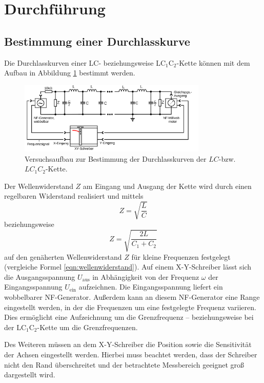 \section{Durchführung}
\label{sec:Durchführung}

\subsection{Bestimmung einer Durchlasskurve}
Die Durchlasskurven einer LC- beziehungsweise LC$_1$C$_2$-Kette können
mit dem Aufbau in Abbildung \ref{fig:durchlasskurve} bestimmt werden.
\begin{figure}
    \centering
    \includegraphics[width=0.8\textwidth]{Bilder/durchlasskurve.png}
    \caption{Versuchsaufbau zur Bestimmung der Durchlasskurven der $LC$-bzw. $LC_1C_2$-Kette. \cite{Anleitung}}
    \label{fig:durchlasskurve}
\end{figure}
Der Wellenwiderstand $Z$ am Eingang und Ausgang der Kette wird durch einen
regelbaren Widerstand realisiert und mittels
\begin{equation}
	Z = \sqrt{\frac{L}{C}}
\end{equation}
beziehungsweise
\begin{equation}
	Z = \sqrt{\frac{2L}{C_1+C_2}}
\end{equation}
auf den genäherten Wellenwiderstand $Z$ für kleine Frequenzen festgelegt (vergleiche Formel \eqref{eqn:wellenwiderstand}).
Auf einem X-Y-Schreiber lässt sich die Ausgangsspannung $U_{\text{aus}}$ in Abhängigkeit von der Frequenz $\omega$ der Eingangsspannung $U_{\text{ein}}$ aufzeichnen.
Die Eingangsspannung liefert ein wobbelbarer NF-Generator.
Außerdem kann an diesem NF-Generator eine Range eingestellt werden, in der die Frequenzen um eine festgelegte Frequenz variieren.
Dies ermöglicht eine Aufzeichnung um die Grenzfrequenz -- beziehungsweise
bei der LC$_1$C$_2$-Kette um die Grenzfrequenzen.

Des Weiteren müssen an dem X-Y-Schreiber die Position sowie die Sensitivität der Achsen eingestellt werden.
Hierbei muss beachtet werden, dass der Schreiber nicht den Rand überschreitet und der betrachtete Messbereich geeignet groß dargestellt wird.

